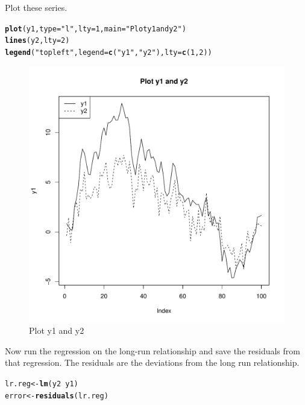 \documentclass{article}\usepackage{graphicx, color}
\makeatletter
\def\maxwidth{ %
  \ifdim\Gin@nat@width>\linewidth
    \linewidth
  \else
    \Gin@nat@width
  \fi
}
\newcommand{\hlfunctioncall}[1]{\textcolor[rgb]{0.501960784313725,0,0.329411764705882}{\textbf{#1}}}%
\newcommand{\hlstring}[1]{\textcolor[rgb]{0.6,0.6,1}{#1}}%
\newenvironment{kframe}{%
 \def\at@end@of@kframe{}%
 \ifinner\ifhmode%
  \def\at@end@of@kframe{\end{minipage}}%
  \begin{minipage}{\columnwidth}%
 \fi\fi%
 \def\FrameCommand##1{\hskip\@totalleftmargin \hskip-\fboxsep
 \colorbox{shadecolor}{##1}\hskip-\fboxsep
     \hskip-\linewidth \hskip-\@totalleftmargin \hskip\columnwidth}%
 \MakeFramed {\advance\hsize-\width
   \@totalleftmargin\z@ \linewidth\hsize
   \@setminipage}}%
 {\par\unskip\endMakeFramed%
 \at@end@of@kframe}
\newenvironment{knitrout}{}{} %
\makeatother
\begin{document}
Plot these series.
\begin{knitrout}
\color{fgcolor}\begin{kframe}
\begin{alltt}
\hlfunctioncall{plot}(y1, type = \hlstring{"l"}, lty = 1, main = \hlstring{"Plot y1 and y2"})
\hlfunctioncall{lines}(y2, lty = 2)
\hlfunctioncall{legend}(\hlstring{"topleft"}, legend = \hlfunctioncall{c}(\hlstring{"y1"}, \hlstring{"y2"}), lty = \hlfunctioncall{c}(1, 2))
\end{alltt}
\end{kframe}\begin{figure}[]

\includegraphics[width=\maxwidth]{figure/Plot-EG} \caption[Plot y1 and y2]{Plot y1 and y2\label{fig:Plot-EG}}
\end{figure}


\end{knitrout}

Now run the regression on the long-run relationship and save the residuals from that regression.  The residuals are the deviations from the long run relationship.  
\begin{knitrout}
\color{fgcolor}\begin{kframe}
\begin{alltt}
lr.reg <- \hlfunctioncall{lm}(y2 ~ y1)
error <- \hlfunctioncall{residuals}(lr.reg)
\end{alltt}
\end{kframe}
\end{knitrout}
\end{document}
